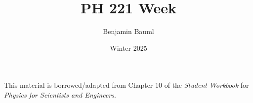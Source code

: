 \documentclass[]{article}
\title{PH 221 Week \Week}
\author{Benjamin Bauml}
\date{Winter 2025}
\newcommand{\FileDepth}{../../..}
\begin{document}
\maketitle
\begin{center}
	This material is borrowed/adapted from Chapter 10 of the \textit{Student Workbook} for \textit{Physics for Scientists and Engineers}.
\end{center}





\end{document}
